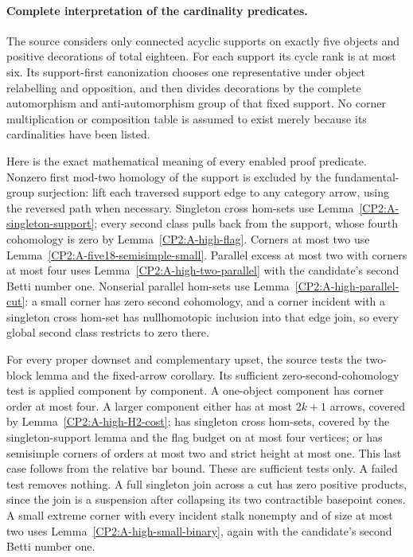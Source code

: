 \paragraph{Complete interpretation of the cardinality predicates.}
The source  considers only connected
acyclic supports on exactly five objects and positive
decorations of total eighteen. For each support its cycle
rank is at most six. Its support-first canonization chooses
one representative under object relabelling and opposition,
and then divides decorations by the complete automorphism
and anti-automorphism group of that fixed support.
No corner multiplication or composition table is assumed
to exist merely because its cardinalities have been listed.

Here is the exact mathematical meaning of every enabled
proof predicate. Nonzero first mod-two homology of the
support is excluded by the fundamental-group surjection:
lift each traversed support edge to any category arrow,
using the reversed path when necessary. Singleton cross
hom-sets use Lemma~\ref{CP2:A-singleton-support}; every
second class pulls back from the support, whose fourth
cohomology is zero by Lemma~\ref{CP2:A-high-flag}.
Corners at most two use
Lemma~\ref{CP2:A-five18-semisimple-small}. Parallel excess
at most two with corners at most four uses
Lemma~\ref{CP2:A-high-two-parallel} with the candidate's
second Betti number one. Nonserial parallel hom-sets use
Lemma~\ref{CP2:A-high-parallel-cut}: a small corner has
zero second cohomology, and a corner incident with a
singleton cross hom-set has nullhomotopic inclusion into
that edge join, so every global second class restricts
to zero there.

For every proper downset and complementary upset, the
source tests the two-block lemma and the fixed-arrow
corollary. Its sufficient zero-second-cohomology test is
applied component by component. A one-object component
has corner order at most four. A larger component either
has at most $2k+1$ arrows, covered by
Lemma~\ref{CP2:A-high-H2-cost}; has singleton cross
hom-sets, covered by the singleton-support lemma and the
flag budget on at most four vertices; or has semisimple
corners of orders at most two and strict height at most
one. This last case follows from the relative bar bound.
These are sufficient tests only. A failed test removes
nothing. A full singleton join across a cut has zero
positive products, since the join is a suspension after
collapsing its two contractible basepoint cones. A small
extreme corner with every incident stalk nonempty and of
size at most two uses Lemma~\ref{CP2:A-high-small-binary},
again with the candidate's second Betti number one.

